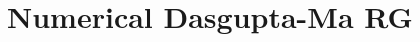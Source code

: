 \documentclass[../main.tex]{subfiles}
\begin{document}
\chapter{Numerical Dasgupta-Ma RG}




\end{document}
